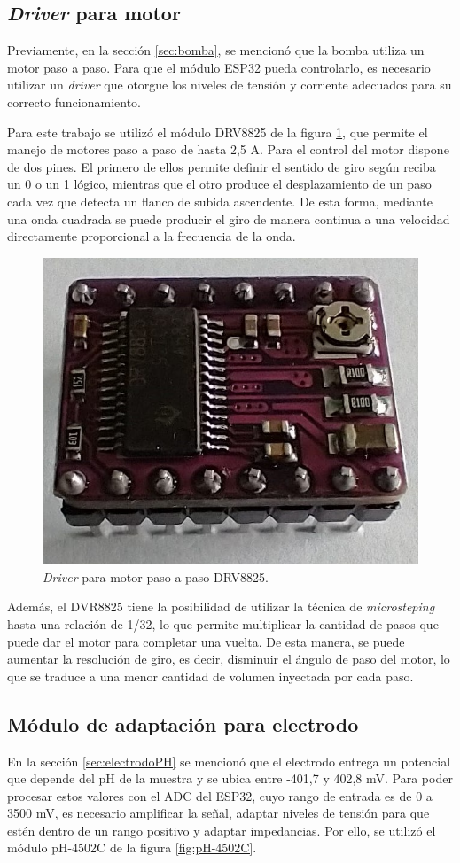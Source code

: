 \subsection{\textit{Driver} para motor}

Previamente, en la sección \ref{sec:bomba}, se mencionó que la bomba utiliza un motor paso a paso. Para que el módulo ESP32 pueda controlarlo, es necesario utilizar un \textit{driver} que otorgue los niveles de tensión y corriente adecuados para su correcto funcionamiento.

Para este trabajo se utilizó el módulo DRV8825  \citep{WEBSITE:7} de la figura \ref{fig:DRV8825-Frente}, que permite el manejo de motores paso a paso de hasta 2,5 A. Para el control del motor dispone de dos pines. El primero de ellos permite definir el sentido de giro según reciba un 0 o un 1 lógico, mientras que el otro produce el desplazamiento de un paso cada vez que detecta un flanco de subida ascendente. De esta forma, mediante una onda cuadrada se puede producir el giro de manera continua a una velocidad directamente proporcional a la frecuencia de la onda.

\begin{figure}[htbp]
	\centering
	\includegraphics[width=.3\textwidth]{./Figures/DRV8825-Frente.jpeg}
	\caption{\textit{Driver} para motor paso a paso DRV8825.}
	\label{fig:DRV8825-Frente}
\end{figure}

Además, el DVR8825 tiene la posibilidad de utilizar la técnica de \textit{microsteping} hasta una relación de 1/32, lo que permite multiplicar la cantidad de pasos que puede dar el motor para completar una vuelta. De esta manera, se puede aumentar la resolución de giro, es decir, disminuir el ángulo de paso del motor, lo que se traduce a una menor cantidad de volumen inyectada por cada paso.

\subsection{Módulo de adaptación para electrodo}

En la sección \ref{sec:electrodoPH} se mencionó que el electrodo entrega un potencial que depende del pH de la muestra y se ubica entre -401,7 y 402,8 mV. Para poder procesar estos valores con el ADC del ESP32, cuyo rango de entrada es de 0 a 3500 mV, es necesario amplificar la señal, adaptar niveles de tensión para que estén dentro de un rango positivo y adaptar impedancias. Por ello, se utilizó el módulo pH-4502C \citep{WEBSITE:8} de la figura \ref{fig:pH-4502C}.

